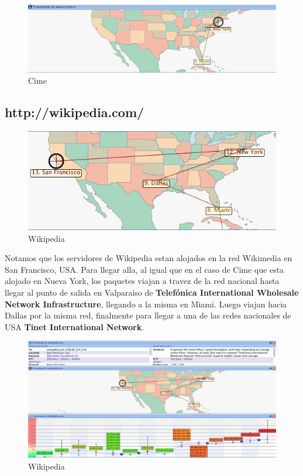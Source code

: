 \documentclass[a4papaer]{article}
\begin{document}
\begin{figure}[h]
  \centering
    \includegraphics[width=1\textwidth]{ss3}
  \caption{Cime}
  \label{fig:Trace Route de http://cime.cl/}
\end{figure}


\pagebreak

\subsection{http://wikipedia.com/}

\begin{figure}[h]
  \centering
    \includegraphics[width=1\textwidth]{ss5}
  \caption{Wikipedia}
  \label{fig:Trace Route de http://wikipedia.org/}
\end{figure}

Notamos que los servidores de Wikipedia estan alojados en la red Wikimedia en San Francisco, USA. Para llegar alla, al igual que en el caso de Cime que esta alojado en Nueva York, los paquetes viajan a travez de la red nacional hasta llegar al punto de salida en Valparaiso de \textbf{Telefónica International Wholesale Network Infrastructure}, llegando a la misma en Miami. Luego viajan hacia Dallas por la misma red, finalmente para llegar a una de las redes nacionales de USA \textbf{Tinet International Network}. 

\begin{figure}[h]
  \centering
    \includegraphics[width=1\textwidth]{ss4}
  \caption{Wikipedia}
  \label{fig:Trace Route de http://wikipedia.org/}
\end{figure}
\end{document}
